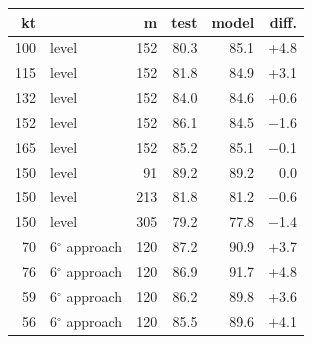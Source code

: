 \begin{tabular}{@{}rlrrrr@{}}
\toprule
kt & & m & test & model & diff. \\
\midrule
100 & level & 152 & 80.3 & 85.1 & +4.8 \\
115 & level & 152 & 81.8 & 84.9 & +3.1 \\
132 & level & 152 & 84.0 & 84.6 & +0.6 \\
152 & level & 152 & 86.1 & 84.5 & $-$1.6 \\
165 & level & 152 & 85.2 & 85.1 & $-$0.1 \\
150 & level & 91 & 89.2 & 89.2 & 0.0 \\
150 & level & 213 & 81.8 & 81.2 & $-$0.6 \\
150 & level & 305 & 79.2 & 77.8 & $-$1.4 \\
70 & 6$^\circ$ approach & 120 & 87.2 & 90.9 & +3.7 \\
76 & 6$^\circ$ approach & 120 & 86.9 & 91.7 & +4.8 \\
59 & 6$^\circ$ approach & 120 & 86.2 & 89.8 & +3.6 \\
56 & 6$^\circ$ approach & 120 & 85.5 & 89.6 & +4.1 \\
\bottomrule
\end{tabular}

